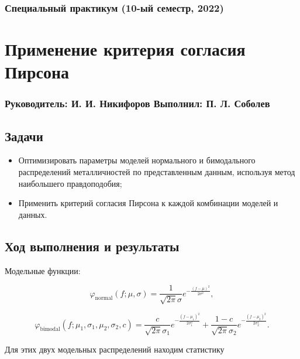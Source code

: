 \documentclass[a4paper, oneside]{article}
\newcommand{\su}{\vspace{-0.5em}}
\begin{document}
\subsubsection*{Специальный практикум (10-ый семестр, 2022)}
\section*{Применение критерия согласия Пирсона}
\subsubsection*{Руководитель: И. И. Никифоров \hspace{2em} Выполнил: П. Л. Соболев}

\vspace{3em}

\subsection*{Задачи}

\begin{itemize}
  \setlength\itemsep{-0.1em}
  \item Оптимизировать параметры моделей нормального и бимодального распределений металличностей по представленным данным, используя метод наибольшего правдоподобия;
  \item Применить критерий согласия Пирсона к каждой комбинации моделей и данных.
\end{itemize}

\subsection*{Ход выполнения и результаты}

Модельные функции:

\su
\begin{equation}
  \varphi_\text{normal}(f; \mu, \sigma) = \frac{1}{\sqrt{2 \pi} \sigma} e^{\displaystyle -\frac{(f - \mu)^2}{2 \sigma^2}},
\end{equation}

\su
\begin{equation}
  \varphi_\text{bimodal}(f; \mu_1, \sigma_1, \mu_2, \sigma_2, c) = \frac{c}{\sqrt{2 \pi} \sigma_1} e^{\displaystyle -\frac{(f - \mu_1)^2}{2 \sigma_1^2}} + \frac{1 - c}{\sqrt{2 \pi} \sigma_2} e^{\displaystyle -\frac{(f - \mu_2)^2}{2 \sigma_2^2}}.
\end{equation}


Для этих двух модельных распределений находим статистику
\end{document}
